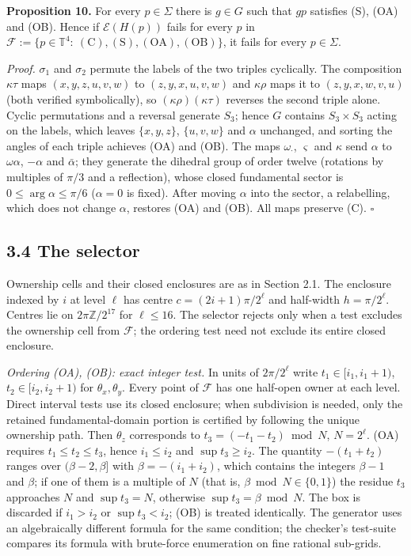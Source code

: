 \documentclass[
  11pt,
]{article}
\begin{document}
\textbf{Proposition 10.} For every \(p\in\Sigma\) there is \(g\in G\)
such that \(gp\) satisfies (S), (OA) and (OB). Hence if
\(\mathcal E(H(p))\) fails for every \(p\) in
\(\mathcal F:=\{p\in\mathbb T^4:\ (\mathrm C),(\mathrm S),(\mathrm{OA}),(\mathrm{OB})\}\),
it fails for every \(p\in\Sigma\).

\emph{Proof.} \(\sigma_1\) and \(\sigma_2\) permute the labels of the
two triples cyclically. The composition \(\kappa\tau\) maps
\((x,y,z,u,v,w)\) to \((z,y,x,u,v,w)\) and \(\kappa\rho\) maps it to
\((z,y,x,w,v,u)\) (both verified symbolically), so
\((\kappa\rho)(\kappa\tau)\) reverses the second triple alone. Cyclic
permutations and a reversal generate \(S_3\); hence \(G\) contains
\(S_3\times S_3\) acting on the labels, which leaves \(\{x,y,z\}\),
\(\{u,v,w\}\) and \(\alpha\) unchanged, and sorting the angles of each
triple achieves (OA) and (OB). The maps \(\omega_\cdot\), \(\varsigma\)
and \(\kappa\) send \(\alpha\) to \(\omega\alpha\), \(-\alpha\) and
\(\bar\alpha\); they generate the dihedral group of order twelve
(rotations by multiples of \(\pi/3\) and a reflection), whose closed
fundamental sector is \(0\le\arg\alpha\le\pi/6\) (\(\alpha=0\) is
fixed). After moving \(\alpha\) into the sector, a relabelling, which
does not change \(\alpha\), restores (OA) and (OB). All maps preserve
(C). \(\square\)

\subsection{3.4 The selector}\label{the-selector}

Ownership cells and their closed enclosures are as in Section 2.1. The
enclosure indexed by \(i\) at level \(\ell\) has centre
\(c=(2i+1)\pi/2^\ell\) and half-width \(h=\pi/2^\ell\). Centres lie on
\(2\pi\mathbb Z/2^{17}\) for \(\ell\le16\). The selector rejects only
when a test excludes the ownership cell from \(\mathcal F\); the
ordering test need not exclude its entire closed enclosure.

\emph{Ordering (OA), (OB): exact integer test.} In units of
\(2\pi/2^\ell\) write \(t_1\in[i_1,i_1+1)\), \(t_2\in[i_2,i_2+1)\) for
\(\theta_x,\theta_y\). Every point of \(\mathcal F\) has one half-open
owner at each level. Direct interval tests use its closed enclosure;
when subdivision is needed, only the retained fundamental-domain portion
is certified by following the unique ownership path. Then \(\theta_z\)
corresponds to \(t_3=(-t_1-t_2)\bmod N\), \(N=2^\ell\). (OA) requires
\(t_1\le t_2\le t_3\), hence \(i_1\le i_2\) and \(\sup t_3\ge i_2\). The
quantity \(-(t_1+t_2)\) ranges over \((\beta-2,\beta]\) with
\(\beta=-(i_1+i_2)\), which contains the integers \(\beta-1\) and
\(\beta\); if one of them is a multiple of \(N\) (that is,
\(\beta\bmod N\in\{0,1\}\)) the residue \(t_3\) approaches \(N\) and
\(\sup t_3=N\), otherwise \(\sup t_3=\beta\bmod N\). The box is
discarded if \(i_1>i_2\) or \(\sup t_3<i_2\); (OB) is treated
identically. The generator uses an algebraically different formula for
the same condition; the checker's test-suite compares its formula with
brute-force enumeration on fine rational sub-grids.
\end{document}
